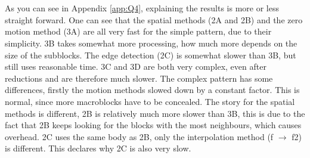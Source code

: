 \section[A comparison of the different results, as well as an explanation of the relation
between the results.]{}
As you can see in Appendix \ref{app:Q4}, explaining the results is more or less straight forward. One can see that the spatial methods (2A and 2B) and the zero motion method (3A) are all very fast for the simple pattern, due to their simplicity. 3B takes somewhat more processing, how much more depends on the size of the subblocks. The edge detection (2C) is somewhat slower than 3B, but still uses reasonable time. 3C and 3D are both very complex, even after reductions and are therefore much slower. 
\npar
The complex pattern has some differences, firstly the motion methods slowed down by a constant factor. This is normal, since more macroblocks have to be concealed. The story for the spatial methods is different, 2B is relatively much more slower than 3B, this is due to the fact that 2B keeps looking for the blocks with the most neighbours, which causes overhead. 2C uses the same body as 2B, only the interpolation method (f $\rightarrow$ f2) is different. This declares why 2C is also very slow.